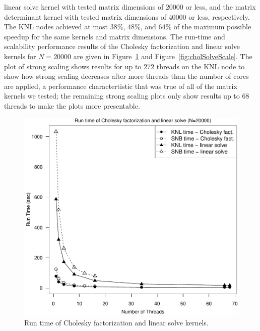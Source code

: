   linear solve kernel with tested matrix dimensions of $20000$ or less,
  and the matrix determinant kernel with tested matrix dimensions of $40000$ or
  less, respectively.
The KNL nodes achieved at most $38\%$, $48\%$, and $64\%$ of the
  maximum possible speedup for the same kernels and matrix dimensions.
The run-time and scalability performance results of the Cholesky factorization
  and linear solve kernels for $N=20000$ are given in Figure~\ref{fig:cholSolveTime}
  and Figure~\ref{fig:cholSolveScale}.
The plot of strong scaling shows results for up to $272$ threads on the KNL
  node to show how strong scaling decreases after more threads than the number of cores
  are applied, a performance charactertistic that was true of all of the matrix
  kernels we tested; the remaining strong scaling plots only show results up to
  $68$ threads to make the plots more presentable.
\begin{figure}
\includegraphics[height=\columnwidth, width=\columnwidth]{chol_solve_20000_68-rt.pdf}
\caption{Run time of Cholesky factorization and linear solve kernels.}
\label{fig:cholSolveTime}
\end{figure}
